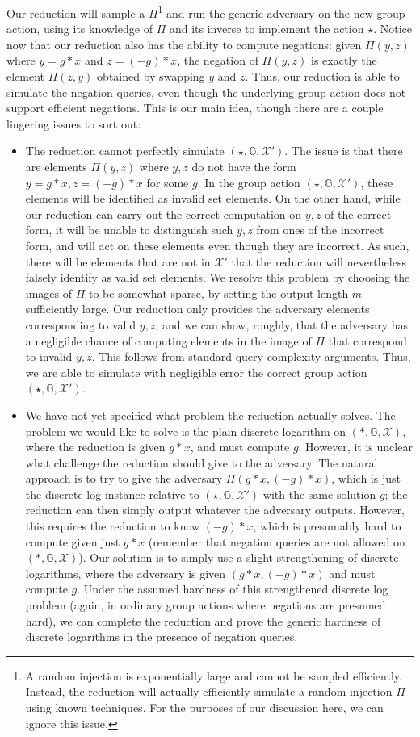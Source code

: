 \documentclass{article}\usepackage[a4paper,margin=20mm]{geometry}
\numberwithin{theorem}{section}
\numberwithin{equation}{section}
\newcommand{\G}{\mathbb{G}}
\newcommand{\Xs}{{\mathcal{X}}}
\begin{document}
Our reduction will sample a $\Pi$\enspace\footnote{A random injection is exponentially large and cannot be sampled efficiently. Instead, the reduction will actually efficiently simulate a random injection $\Pi$ using known techniques. For the purposes of our discussion here, we can ignore this issue.} and run the generic adversary on the new group action, using its knowledge of $\Pi$ and its inverse to implement the action $\star$. Notice now that our reduction also has the ability to compute negations: given $\Pi(y,z)$ where $y=g*x$ and $z=(-g)*x$, the negation of $\Pi(y,z)$ is exactly the element $\Pi(z,y)$ obtained by swapping $y$ and $z$. Thus, our reduction is able to simulate the negation queries, even though the underlying group action does not support efficient negations. This is our main idea, though there are a couple lingering issues to sort out:
\begin{itemize}
	\item The reduction cannot perfectly simulate $(\star,\G,\Xs')$. The issue is that there are elements $\Pi(y,z)$ where $y,z$ do not have the form $y=g*x,z=(-g)*x$ for some $g$. In the group action $(\star,\G,\Xs')$, these elements will be identified as invalid set elements. On the other hand, while our reduction can carry out the correct computation on $y,z$ of the correct form, it will be unable to distinguish such $y,z$ from ones of the incorrect form, and will act on these elements even though they are incorrect. As such, there will be elements that are not in $\Xs'$ that the reduction will nevertheless falsely identify as valid set elements. We resolve this problem by choosing the images of $\Pi$ to be somewhat sparse, by setting the output length $m$ sufficiently large. Our reduction only provides the adversary elements corresponding to valid $y,z$, and we can show, roughly, that the adversary has a negligible chance of computing elements in the image of $\Pi$ that correspond to invalid $y,z$. This follows from standard query complexity arguments. Thus, we are able to simulate with negligible error the correct group action $(\star,\G,\Xs')$.
	\item We have not yet specified what problem the reduction actually solves. The problem we would like to solve is the plain discrete logarithm on $(*,\G,\Xs)$, where the reduction is given $g*x$, and must compute $g$. However, it is unclear what challenge the reduction should give to the adversary. The natural approach is to try to give the adversary $\Pi(g*x,(-g)*x)$, which is just the discrete log instance relative to $(\star,\G,\Xs')$ with the same solution $g$; the reduction can then simply output whatever the adversary outputs. However, this requires the reduction to know $(-g)*x$, which is presumably hard to compute given just $g*x$ (remember that negation queries are not allowed on $(*,\G,\Xs)$). Our solution is to simply use a slight strengthening of discrete logarithms, where the adversary is given $(g*x,(-g)*x)$ and must compute $g$. Under the assumed hardness of this strengthened discrete log problem (again, in ordinary group actions where negations are presumed hard), we can complete the reduction and prove the generic hardness of discrete logarithms in the presence of negation queries.
\end{itemize}
\end{document}
